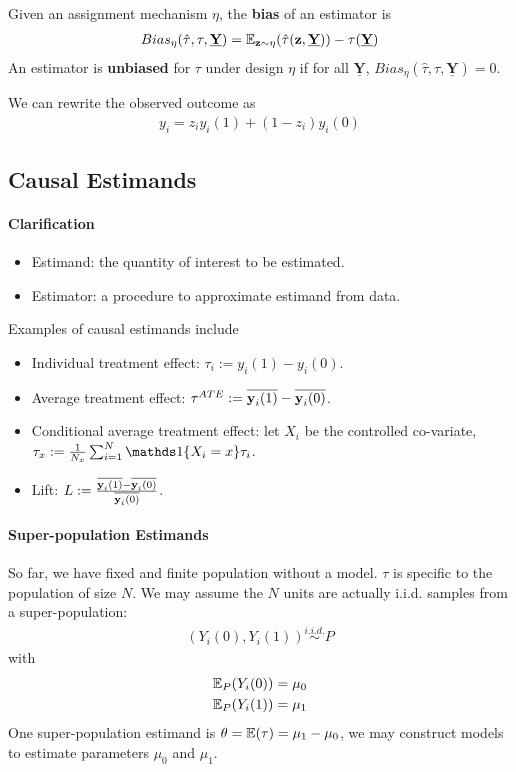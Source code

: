 \documentclass[11pt]{article}
\newcommand{\science}[0]{\underline{\textbf{Y}}}
\begin{document}
	\begin{definition}
		Given an assignment mechanism $\eta$, the \textbf{bias} of an estimator is
		\begin{align}
			Bias_\eta(\hat{\tau}, \tau, \science) = \expe_{\vez \sim \eta} (\hat{\tau}(\vez, \science)) - \tau(\science)
		\end{align}
		An estimator is \textbf{unbiased} for $\tau$ under design $\eta$ if for all $\science$, $Bias_\eta(\hat{\tau}, \tau, \science) = 0$.
	\end{definition}
	We can rewrite the observed outcome as
	\begin{align}
		y_i = z_i y_i(1) + (1-z_i) y_i(0)
	\end{align}
	
	\subsection{Causal Estimands}
	\paragraph{Clarification}
	\begin{itemize}
		\item Estimand: the quantity of interest to be estimated.
		\item Estimator: a procedure to approximate estimand from data.
	\end{itemize}
	
	\begin{example}
		Examples of causal estimands include
		\begin{itemize}
			\item Individual treatment effect: $\tau_i := y_i(1) - y_i(0)$.
			\item Average treatment effect: $\tau^{ATE} := \overline{\textbf{y}_i(1)} - \overline{\textbf{y}_i(0)}$.
			\item Conditional average treatment effect: let $X_i$ be the controlled co-variate, $\tau_x := \frac{1}{N_x} \sum_{i=1}^N \id{X_i = x} \tau_i$.
			\item Lift: $L := \frac{\overline{\textbf{y}_i(1)} - \overline{\textbf{y}_i(0)}}{\overline{\textbf{y}_i(0)}}$.
		\end{itemize}
	\end{example}

	\paragraph{Super-population Estimands} So far, we have fixed and finite population without a model. $\tau$ is specific to the population of size $N$. We may assume the $N$ units are actually i.i.d. samples from a super-population:
	\begin{align}
		(Y_i(0), Y_i(1)) \overset{i.i.d.}{\sim} P
	\end{align}
	with
	\begin{align}
		\mathbb{E}_P(Y_i(0)) = \mu_0 \\
		\mathbb{E}_P(Y_i(1)) = \mu_1
	\end{align}
	One super-population estimand is $\theta = \mathbb{E}(\tau) = \mu_1 - \mu_0$, we may construct models to estimate parameters $\mu_0$ and $\mu_1$.
	
\end{document}

